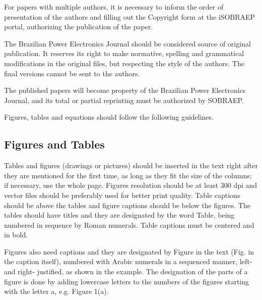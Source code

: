 \documentclass[english]{cobep-spec}
\begin{document}
For papers with multiple authors, it is necessary to inform the order of presentation of the authors and filling out the Copyright form at the iSOBRAEP portal, authorizing the publication of the paper.

The Brazilian Power Electronics Journal should be considered source of original publication. It reserves its right to make normative, spelling and grammatical modifications in the original files, but respecting the style of the authors. The final versions cannot be sent to the authors.

The published papers will become property of the Brazilian Power Electronics Journal, and its total or partial reprinting must be authorized by SOBRAEP.

Figures, tables and equations should follow the following guidelines.

\subsection{Figures and Tables}

Tables and figures (drawings or pictures) should be inserted in the text right after they are mentioned for the first time, as long as they fit the size of the columns; if necessary, use the whole page. Figures resolution should be at least 300 dpi and vector files should be preferably used for better print quality. Table captions should be above the tables and figure captions should be below the figures. The tables should have titles and they are designated by the word Table, being numbered in sequence by Roman numerals. Table captions must be centered and in bold.

Figures also need captions and they are designated by Figure in the text (Fig. in the caption itself), numbered with Arabic numerals in a sequenced manner, left- and right- justified, as shown in the example. The designation of the parts of a figure is done by adding lowercase letters to the numbers of the figures starting with the letter a, e.g. Figure 1(a).
\end{document}
